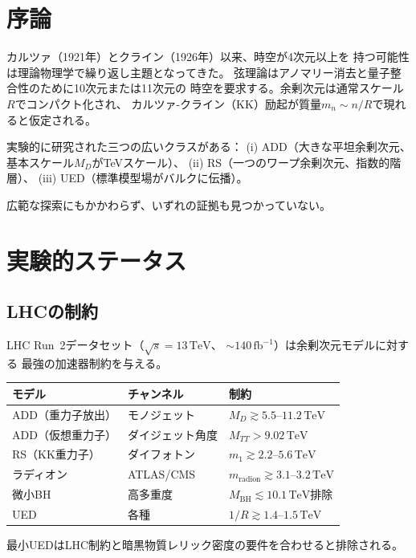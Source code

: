 \documentclass[12pt]{article}
\theoremstyle{plain}
\theoremstyle{definition}
\numberwithin{equation}{section}
\begin{document}
\section{序論}\label{sec:intro}

カルツァ（1921年）とクライン（1926年）以来、時空が4次元以上を
持つ可能性は理論物理学で繰り返し主題となってきた。
弦理論はアノマリー消去と量子整合性のために10次元または11次元の
時空を要求する。余剰次元は通常スケール$R$でコンパクト化され、
カルツァ-クライン（KK）励起が質量$m_n\sim n/R$で現れると仮定される。

実験的に研究された三つの広いクラスがある：
(i) ADD（大きな平坦余剰次元、基本スケール$M_D$がTeVスケール）、
(ii) RS（一つのワープ余剰次元、指数的階層）、
(iii) UED（標準模型場がバルクに伝播）。

広範な探索にもかかわらず、いずれの証拠も見つかっていない。


\section{実験的ステータス}\label{sec:experiment}

\subsection{LHCの制約}

LHC Run~2データセット（$\sqrt{s}=13\,\mathrm{TeV}$、
$\sim140\,\mathrm{fb}^{-1}$）は余剰次元モデルに対する
最強の加速器制約を与える。

\begin{center}
\begin{tabular}{lll}
\toprule
モデル & チャンネル & 制約\\
\midrule
ADD（重力子放出）& モノジェット & $M_D\gtrsim 5.5$--$11.2\,\mathrm{TeV}$\\
ADD（仮想重力子）& ダイジェット角度 & $M_{TT}>9.02\,\mathrm{TeV}$\\
RS（KK重力子）& ダイフォトン & $m_1\gtrsim 2.2$--$5.6\,\mathrm{TeV}$\\
ラディオン & ATLAS/CMS & $m_{\mathrm{radion}}\gtrsim 3.1$--$3.2\,\mathrm{TeV}$\\
微小BH & 高多重度 & $M_{\mathrm{BH}}\lesssim 10.1\,\mathrm{TeV}$排除\\
UED & 各種 & $1/R\gtrsim 1.4$--$1.5\,\mathrm{TeV}$\\
\bottomrule
\end{tabular}
\end{center}

最小UEDはLHC制約と暗黒物質レリック密度の要件を合わせると排除される。
\end{document}
